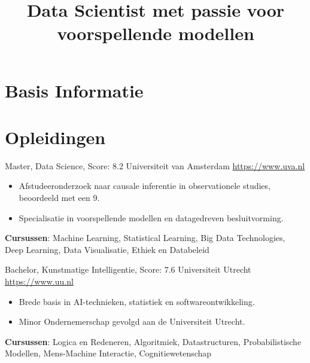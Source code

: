 \documentclass[a4paper, serif, 10pt]{moderncv}
\title{Data Scientist met passie voor voorspellende modellen}
\begin{document}
\maketitle

\section{Basis Informatie}

\section{Opleidingen}

        {Master, Data Science, Score: 8.2}
        {Universiteit van Amsterdam}
        {\url{https://www.uva.nl}}
        {}
        {\begin{itemize}
\item Afstudeeronderzoek naar causale inferentie in observationele studies, beoordeeld met een 9.
\item Specialisatie in voorspellende modellen en datagedreven besluitvorming.
\end{itemize}
\textbf{Cursussen}: Machine Learning, Statistical Learning, Big Data Technologies, Deep Learning, Data Visualisatie, Ethiek en Databeleid}

        {Bachelor, Kunstmatige Intelligentie, Score: 7.6}
        {Universiteit Utrecht}
        {\url{https://www.uu.nl}}
        {}
        {\begin{itemize}
\item Brede basis in AI-technieken, statistiek en softwareontwikkeling.
\item Minor Ondernemerschap gevolgd aan de Universiteit Utrecht.
\end{itemize}
\textbf{Cursussen}: Logica en Redeneren, Algoritmiek, Datastructuren, Probabilistische Modellen, Mens-Machine Interactie, Cognitiewetenschap}
\end{document}
